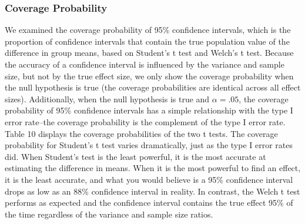 \documentclass[man,a4paper,noextraspace,apacite]{apa6}\usepackage[]{graphicx}\usepackage[]{color}
\begin{document}
\subsubsection{Coverage Probability}
We examined the coverage probability of 95\% confidence intervals, which is the proportion of confidence intervals that contain the true population value of the difference in group means, based on Student's t test and Welch's t test. Because the accuracy of a confidence interval is influenced by the variance and sample size, but not by the true effect size, we only show the coverage probability when the null hypothesis is true (the coverage probabilities are identical across all effect sizes). Additionally, when the null hypothesis is true and $\alpha = .05$, the coverage probability of 95\% confidence intervals has a simple relationship with the type I error rate--the coverage probability is the complement of the type I error rate. Table 10 displays the coverage probabilities of the two t tests. The coverage probability for Student's t test varies dramatically, just as the type I error rates did. When Student's test is the least powerful, it is the most accurate at estimating the difference in means. When it is the most powerful to find an effect, it is the least accurate, and what you would believe is a 95\% confidence interval drops as low as an 88\% confidence interval in reality. In contrast, the Welch t test performs as expected and the confidence interval contains the true effect 95\% of the time regardless of the variance and sample size ratios. 
\end{document}
